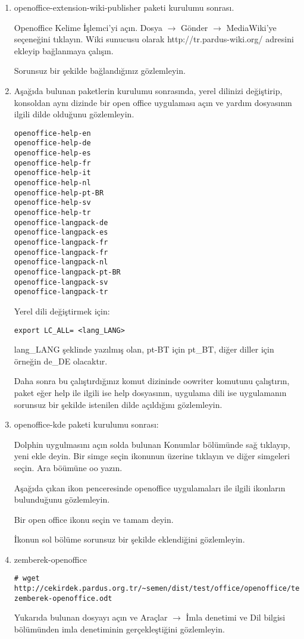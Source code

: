 \documentclass[a4paper,10pt]{article}
\begin{document}
\begin{enumerate}
\item openoffice-extension-wiki-publisher paketi kurulumu sonrası.

Openoffice Kelime İşlemci'yi açın. Dosya $\rightarrow$ Gönder $\rightarrow$ MediaWiki'ye seçeneğini tıklayın. Wiki sunucusu olarak http://tr.pardus-wiki.org/ adresini ekleyip bağlanmaya çalışın.

Sorunsuz bir şekilde bağlandığınız gözlemleyin.

\item Aşağıda bulunan paketlerin kurulumu sonrasında, yerel dilinizi değiştirip, konsoldan aynı dizinde bir open office uygulaması açın ve yardım dosyasının ilgili dilde olduğunu gözlemleyin.
\begin{verbatim}
openoffice-help-en 
openoffice-help-de
openoffice-help-es
openoffice-help-fr
openoffice-help-it
openoffice-help-nl
openoffice-help-pt-BR
openoffice-help-sv
openoffice-help-tr
openoffice-langpack-de
openoffice-langpack-es
openoffice-langpack-fr
openoffice-langpack-fr
openoffice-langpack-nl
openoffice-langpack-pt-BR
openoffice-langpack-sv
openoffice-langpack-tr

\end{verbatim}

Yerel dili değiştirmek için:
\begin{verbatim}
export LC_ALL= <lang_LANG>
\end{verbatim}

lang\_LANG şeklinde yazılmış olan, pt-BT için pt\_BT, diğer diller için örneğin de\_DE olacaktır.

Daha sonra bu çalıştırdığınız komut dizininde oowriter komutunu çalıştırın, paket eğer help ile ilgili ise help dosyasının, uygulama dili ise uygulamanın sorunsuz bir şekilde istenilen dilde açıldığını gözlemleyin.


\item openoffice-kde paketi kurulumu sonrası:

Dolphin uygulmasını açın solda bulunan Konumlar bölümünde sağ tıklayıp, yeni ekle deyin. Bir simge seçin ikonunun üzerine tıklayın ve diğer simgeleri seçin. Ara böümüne oo yazın.

Aşağıda çıkan ikon penceresinde openoffice uygulamaları ile ilgili ikonların bulunduğunu gözlemleyin.

Bir open office ikonu seçin ve tamam deyin.

İkonun sol bölüme sorunsuz bir şekilde eklendiğini gözlemleyin.

\item zemberek-openoffice

\begin{verbatim}
# wget http://cekirdek.pardus.org.tr/~semen/dist/test/office/openoffice/test-zemberek-openoffice.odt
\end{verbatim}

Yukarıda bulunan dosyayı açın ve Araçlar $\rightarrow$ İmla denetimi ve Dil bilgisi bölümünden imla denetiminin gerçekleştiğini gözlemleyin.
\end{enumerate}
\end{document}
